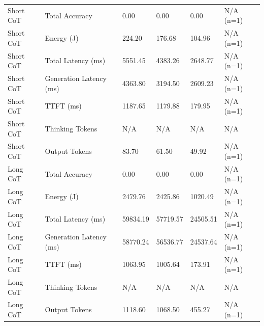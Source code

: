 \begin{table}
\begin{tabular}{llllll}
Short CoT & Total Accuracy & 0.00 & 0.00 & 0.00 & N/A (n=1) \\
Short CoT & Energy (J) & 224.20 & 176.68 & 104.96 & N/A (n=1) \\
Short CoT & Total Latency (ms) & 5551.45 & 4383.26 & 2648.77 & N/A (n=1) \\
Short CoT & Generation Latency (ms) & 4363.80 & 3194.50 & 2609.23 & N/A (n=1) \\
Short CoT & TTFT (ms) & 1187.65 & 1179.88 & 179.95 & N/A (n=1) \\
Short CoT & Thinking Tokens & N/A & N/A & N/A & N/A \\
Short CoT & Output Tokens & 83.70 & 61.50 & 49.92 & N/A (n=1) \\
Long CoT & Total Accuracy & 0.00 & 0.00 & 0.00 & N/A (n=1) \\
Long CoT & Energy (J) & 2479.76 & 2425.86 & 1020.49 & N/A (n=1) \\
Long CoT & Total Latency (ms) & 59834.19 & 57719.57 & 24505.51 & N/A (n=1) \\
Long CoT & Generation Latency (ms) & 58770.24 & 56536.77 & 24537.64 & N/A (n=1) \\
Long CoT & TTFT (ms) & 1063.95 & 1005.64 & 173.91 & N/A (n=1) \\
Long CoT & Thinking Tokens & N/A & N/A & N/A & N/A \\
Long CoT & Output Tokens & 1118.60 & 1068.50 & 455.27 & N/A (n=1) \\
\bottomrule
\end{tabular}
\end{table}
